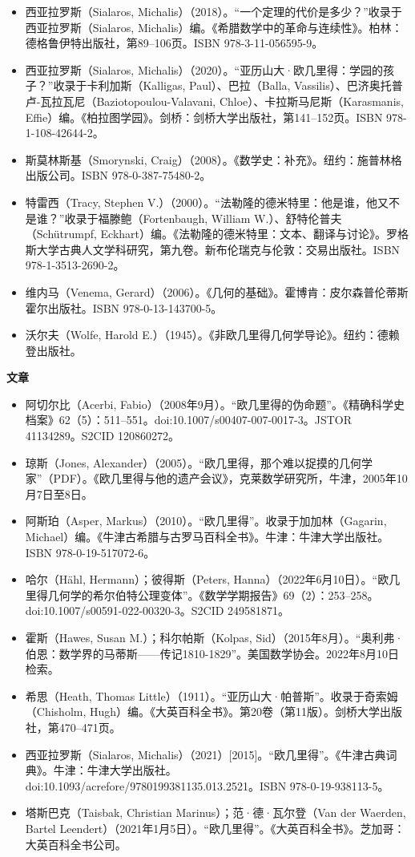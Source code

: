 \begin{itemize}
\item 西亚拉罗斯（Sialaros, Michalis）（2018）。“一个定理的代价是多少？”收录于西亚拉罗斯（Sialaros, Michalis）编。《希腊数学中的革命与连续性》。柏林：德格鲁伊特出版社，第89–106页。ISBN 978-3-11-056595-9。  
\item 西亚拉罗斯（Sialaros, Michalis）（2020）。“亚历山大·欧几里得：学园的孩子？”收录于卡利加斯（Kalligas, Paul）、巴拉（Balla, Vassilis）、巴济奥托普卢-瓦拉瓦尼（Baziotopoulou-Valavani, Chloe）、卡拉斯马尼斯（Karasmanis, Effie）编。《柏拉图学园》。剑桥：剑桥大学出版社，第141–152页。ISBN 978-1-108-42644-2。  
\item 斯莫林斯基（Smorynski, Craig）（2008）。《数学史：补充》。纽约：施普林格出版公司。ISBN 978-0-387-75480-2。
\item 特雷西（Tracy, Stephen V.）（2000）。“法勒隆的德米特里：他是谁，他又不是谁？”收录于福滕鲍（Fortenbaugh, William W.）、舒特伦普夫（Schütrumpf, Eckhart）编。《法勒隆的德米特里：文本、翻译与讨论》。罗格斯大学古典人文学科研究，第九卷。新布伦瑞克与伦敦：交易出版社。ISBN 978-1-3513-2690-2。  
\item 维内马（Venema, Gerard）（2006）。《几何的基础》。霍博肯：皮尔森普伦蒂斯霍尔出版社。ISBN 978-0-13-143700-5。  
\item 沃尔夫（Wolfe, Harold E.）（1945）。《非欧几里得几何学导论》。纽约：德赖登出版社。
\end{itemize}
\textbf{文章}  
\begin{itemize}
\item 阿切尔比（Acerbi, Fabio）（2008年9月）。“欧几里得的伪命题”。《精确科学史档案》62（5）：511–551。doi:10.1007/s00407-007-0017-3。JSTOR 41134289。S2CID 120860272。  
\item 琼斯（Jones, Alexander）（2005）。“欧几里得，那个难以捉摸的几何学家”（PDF）。《欧几里得与他的遗产会议》，克莱数学研究所，牛津，2005年10月7日至8日。  
\item 阿斯珀（Asper, Markus）（2010）。“欧几里得”。收录于加加林（Gagarin, Michael）编。《牛津古希腊与古罗马百科全书》。牛津：牛津大学出版社。ISBN 978-0-19-517072-6。  
\item 哈尔（Hähl, Hermann）；彼得斯（Peters, Hanna）（2022年6月10日）。“欧几里得几何学的希尔伯特公理变体”。《数学学期报告》69（2）：253–258。doi:10.1007/s00591-022-00320-3。S2CID 249581871。  
\item 霍斯（Hawes, Susan M.）；科尔帕斯（Kolpas, Sid）（2015年8月）。“奥利弗·伯恩：数学界的马蒂斯——传记1810-1829”。美国数学协会。2022年8月10日检索。  
\item 希思（Heath, Thomas Little）（1911）。“亚历山大·帕普斯”。收录于奇索姆（Chisholm, Hugh）编。《大英百科全书》。第20卷（第11版）。剑桥大学出版社，第470–471页。  
\item 西亚拉罗斯（Sialaros, Michalis）（2021）[2015]。“欧几里得”。《牛津古典词典》。牛津：牛津大学出版社。doi:10.1093/acrefore/9780199381135.013.2521。ISBN 978-0-19-938113-5。  
\item 塔斯巴克（Taisbak, Christian Marinus）；范·德·瓦尔登（Van der Waerden, Bartel Leendert）（2021年1月5日）。“欧几里得”。《大英百科全书》。芝加哥：大英百科全书公司。
\end{itemize}
